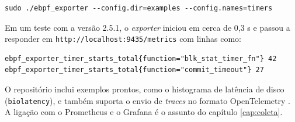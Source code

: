 \begin{lstlisting}
sudo ./ebpf_exporter --config.dir=examples --config.names=timers
\end{lstlisting}

Em um teste com a versão 2.5.1, o \textit{exporter} iniciou em cerca de 0,3 s e passou a responder em \texttt{http://localhost:9435/metrics} com linhas como:

\begin{lstlisting}
ebpf_exporter_timer_starts_total{function="blk_stat_timer_fn"} 42
ebpf_exporter_timer_starts_total{function="commit_timeout"} 27
\end{lstlisting}

O repositório inclui exemplos prontos, como o histograma de latência de disco (\texttt{biolatency}), e também suporta o envio de \textit{traces} no formato OpenTelemetry \cite{ebpfexporter}. A ligação com o Prometheus e o Grafana é o assunto do capítulo \ref{cap:coleta}.
